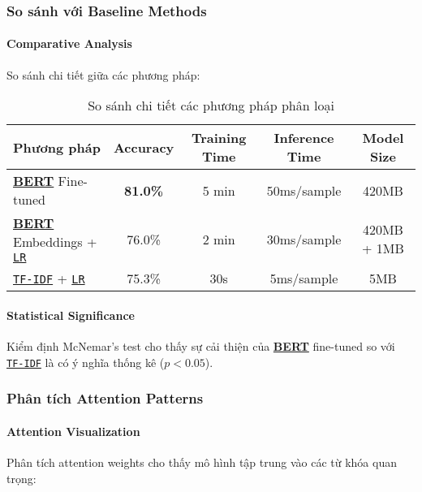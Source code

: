 \subsubsection{So sánh với Baseline Methods}

\paragraph{Comparative Analysis}
So sánh chi tiết giữa các phương pháp:

\begin{table}[H]
\centering
\caption{So sánh chi tiết các phương pháp phân loại}
\label{tab:detailed_comparison}
\begin{tabular}{lcccc}
\toprule
\textbf{Phương pháp} & \textbf{Accuracy} & \textbf{Training Time} & \textbf{Inference Time} & \textbf{Model Size} \\
\midrule
\hyperref[acro:bert]{\textbf{BERT}} Fine-tuned & \textbf{81.0\%} & 5 min & 50ms/sample & 420MB \\
\hyperref[acro:bert]{\textbf{BERT}} Embeddings + \hyperref[acro:lr]{\texttt{LR}} & 76.0\% & 2 min & 30ms/sample & 420MB + 1MB \\
\hyperref[acro:tfidf]{\texttt{TF-IDF}} + \hyperref[acro:lr]{\texttt{LR}} & 75.3\% & 30s & 5ms/sample & 5MB \\
\bottomrule
\end{tabular}
\end{table}

\paragraph{Statistical Significance}
Kiểm định McNemar's test cho thấy sự cải thiện của \hyperref[acro:bert]{\textbf{BERT}} fine-tuned so với \hyperref[acro:tfidf]{\texttt{TF-IDF}} là có ý nghĩa
thống kê ($p < 0.05$).

\subsubsection{Phân tích Attention Patterns}

\paragraph{Attention Visualization}
Phân tích attention weights cho thấy mô hình tập trung vào các từ khóa quan trọng:

